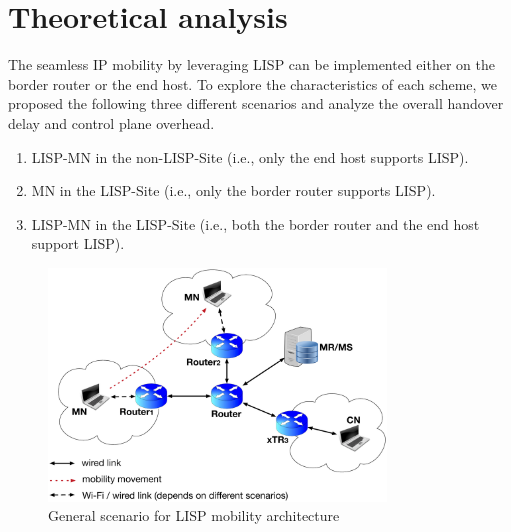 \section{Theoretical analysis}
\label{sec:ns3_analysis}
The seamless IP mobility by leveraging LISP can be implemented either on the border router or the end host. To explore the characteristics of each scheme, we proposed the following three different scenarios and analyze the overall handover delay and control plane overhead. 
\begin{enumerate}[noitemsep,topsep=0pt]
	\item LISP-MN in the non-LISP-Site (i.e., only the end host supports LISP). 
	\item MN in the LISP-Site (i.e., only the border router supports LISP). 
	\item LISP-MN in the LISP-Site (i.e., both the border router and the end host support LISP). 
\end{enumerate}	
\begin{figure}[!th]
	\centering
	\includegraphics[width=0.8\textwidth]{Pics/LISP_mobility_archi}
	\caption{General scenario for LISP mobility architecture}
	\label{sim_archi}
\end{figure}

